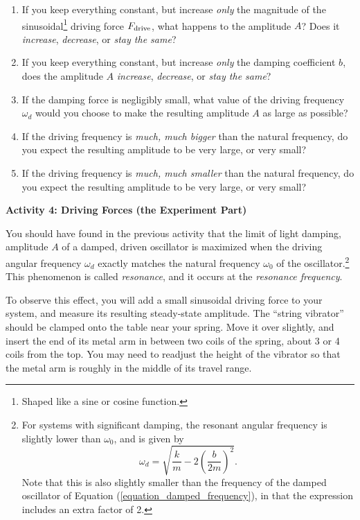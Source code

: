\begin{enumerate}[labparts]

\item If you keep everything constant, but increase \textit{only} the magnitude of the sinusoidal\footnote{Shaped like a sine or cosine function.}
driving force $F_{\rm drive}$, what happens to the amplitude $A$?  Does it \textit{increase}, \textit{decrease}, or \textit{stay the same}?
\answerspace{0.7in}

\item If you keep everything constant, but increase \textit{only} the damping coefficient $b$, does the amplitude $A$ \textit{increase}, \textit{decrease}, or \textit{stay the same}?
\answerspace{0.7in}

\item If the damping force is negligibly small, what value of the driving frequency $\omega_d$ would you choose to make the resulting amplitude $A$ as large as possible?
\answerspace{0.7in}

\item If the driving frequency is \textit{much, much bigger} than the natural frequency, do you expect the resulting amplitude to be very large, or very small?
\answerspace{0.7in}

\item If the driving frequency is \textit{much, much smaller} than the natural frequency, do you expect the resulting amplitude to be very large, or very small?
\answerspace{0.7in}

\end{enumerate}

\pagebreak
\textbf{Activity 4: Driving Forces (the Experiment Part)}

You should have found in the previous activity that the limit of light damping, amplitude $A$ of a damped, driven oscillator is maximized when the driving angular frequency $\omega_d$ exactly matches the natural frequency $\omega_0$ of the oscillator.\footnote{%
For systems with significant damping, the resonant angular frequency is slightly lower than $\omega_0$, and is given by
$$
\omega_d =\sqrt{\frac{k}{m} - 2\left( \frac{b}{2m}\right)^2}.
$$
Note that this is also slightly smaller than the frequency of the damped oscillator of Equation (\ref{equation_damped_frequency}), in that the expression includes an extra factor of 2.
}
This phenomenon is called \textit{resonance}, and it occurs at the \textit{resonance frequency}.

To observe this effect, you will add a small sinusoidal driving force to your system, and measure its resulting steady-state amplitude.
The ``string vibrator'' should be clamped onto the table near your spring.  Move it over slightly, and insert the end of its metal arm in between two coils of the spring, about 3 or 4 coils from the top.  You may need to readjust the height of the vibrator so that the metal arm is roughly in the middle of its travel range.

